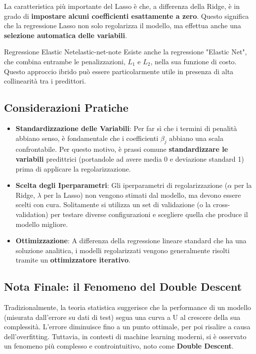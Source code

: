 La caratteristica più importante del Lasso è che, a differenza della Ridge, è
in grado di \textbf{impostare alcuni coefficienti esattamente a zero}. Questo
significa che la regressione Lasso non solo regolarizza il modello, ma effettua
anche una \textbf{selezione automatica delle variabili}.

\begin{nota}{Regressione Elastic Net}{elastic-net-note}
Esiste anche la regressione "Elastic Net", che combina entrambe le
penalizzazioni, \(L_1\) e \(L_2\), nella sua funzione di costo. Questo approccio
ibrido può essere particolarmente utile in presenza di alta collinearità tra i
predittori.
\end{nota}

\subsection{Considerazioni Pratiche}

\begin{itemize}
    \item \textbf{Standardizzazione delle Variabili}: Per far sì che i termini
    di penalità abbiano senso, è fondamentale che i coefficienti \(\beta_j\)
    abbiano una scala confrontabile. Per questo motivo, è prassi comune
    \textbf{standardizzare le variabili} predittrici (portandole ad avere media
    0 e deviazione standard 1) prima di applicare la regolarizzazione.
    \item \textbf{Scelta degli Iperparametri}: Gli iperparametri di
    regolarizzazione (\(\alpha\) per la Ridge, \(\lambda\) per la Lasso) non
    vengono stimati dal modello, ma devono essere scelti con cura. Solitamente
    si utilizza un set di validazione (o la cross-validation) per testare
    diverse configurazioni e scegliere quella che produce il modello migliore.
    \item \textbf{Ottimizzazione}: A differenza della regressione lineare
    standard che ha una soluzione analitica, i modelli regolarizzati vengono
    generalmente risolti tramite un \textbf{ottimizzatore iterativo}.
\end{itemize}

\subsection{Nota Finale: il Fenomeno del Double Descent}

Tradizionalmente, la teoria statistica suggerisce che la performance di un
modello (misurata dall'errore su dati di test) segua una curva a U al crescere
della sua complessità. L'errore diminuisce fino a un punto ottimale, per poi
risalire a causa dell'overfitting. Tuttavia, in contesti di machine learning
moderni, si è osservato un fenomeno più complesso e controintuitivo, noto come
\textbf{Double Descent}.

